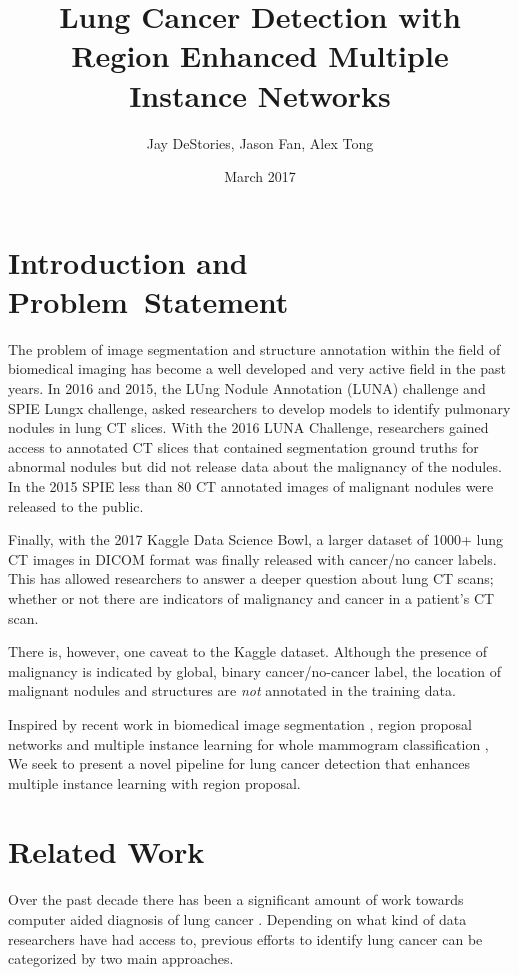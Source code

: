 \documentclass[twocolumn,10pt]{article}
\title{Lung Cancer Detection with \\Region Enhanced 
Multiple Instance Networks}
\author{Jay DeStories, Jason Fan, Alex Tong}
\date{March 2017}
\begin{document}
\maketitle
\section{Introduction and \\Problem~Statement}
The problem of image segmentation and structure annotation within the 
field of biomedical imaging has become a well developed and very active field in
the past years. In 2016 and 2015, the LUng Nodule Annotation (LUNA) challenge and 
SPIE Lungx challenge, asked researchers to develop models to identify pulmonary 
nodules in lung CT slices. With the 2016 LUNA Challenge, researchers gained access
to annotated CT slices that contained segmentation ground truths for abnormal 
nodules but did not release data about the malignancy of the nodules. 
In the 2015 SPIE less than 80 CT annotated images of malignant nodules were 
released to the public.

Finally, with the 2017 Kaggle Data Science Bowl, a larger dataset of
1000+ lung CT images in DICOM format was finally released with cancer/no cancer 
labels. This has allowed researchers to answer a deeper question about lung CT
scans; whether or not there are indicators of malignancy and cancer in a patient's
CT scan.

There is, however, one caveat to the Kaggle dataset. 
Although the presence of malignancy is indicated by global, binary 
cancer/no-cancer label, the location of malignant nodules and structures are
\textit{not} annotated in the training data.

Inspired by recent work in biomedical image segmentation
\cite{DBLP:journals/corr/ChristEETBBRAHD16}, region proposal 
networks and multiple instance learning for whole mammogram classification
\cite{Maron:1998:FML:302528.302753},
We seek to present a novel pipeline for lung cancer detection that enhances
multiple instance learning with region proposal.

\section{Related Work}

Over the past decade there has been a significant amount of work towards 
computer aided diagnosis of lung cancer \cite{cad_1998}. Depending on what kind
of data researchers have had access to, previous efforts to identify lung cancer
can be categorized by two main approaches. 
\end{document}
